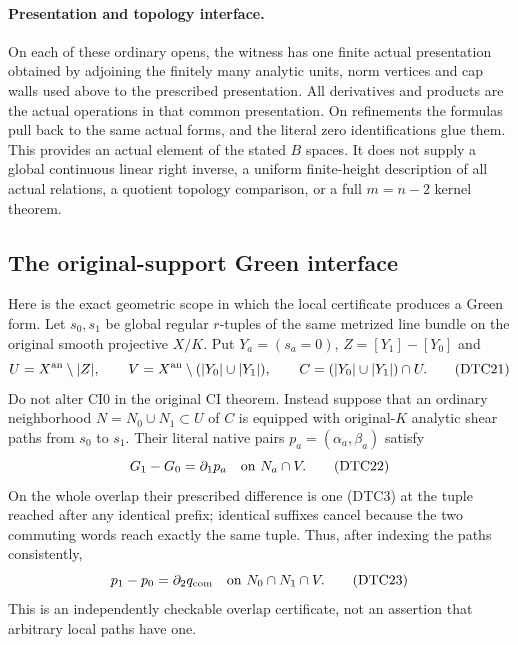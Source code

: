 \paragraph{Presentation and topology interface.}
On each of these ordinary opens, the witness has one finite actual
presentation obtained by adjoining the finitely many analytic units,
norm vertices and cap walls used above to the prescribed presentation.
All derivatives and products are the actual operations in that common
presentation.  On refinements the formulas pull back to the same
actual forms, and the literal zero identifications glue them.
This provides an actual element of the stated $B$ spaces.  It does
not supply a global continuous linear right inverse, a uniform
finite-height description of all actual relations, a quotient
topology comparison, or a full $m=n-2$ kernel theorem.

\subsection{The original-support Green interface}

Here is the exact geometric scope in which the local certificate
produces a Green form.  Let $s_0,s_1$ be global regular $r$-tuples
of the same metrized line bundle on the original smooth projective
$X/K$.  Put $Y_a=(s_a=0)$, $Z=[Y_1]-[Y_0]$ and
\[
 U=X^{\rm an}\setminus|Z|,\qquad
 V=X^{\rm an}\setminus(|Y_0|\cup|Y_1|),\qquad
 C=(|Y_0|\cup|Y_1|)\cap U.
 \tag{DTC21}
\]
Do not alter CI0 in the original CI theorem.  Instead suppose that
an ordinary neighborhood $N=N_0\cup N_1\subset U$ of $C$ is
equipped with original-$K$ analytic shear paths from $s_0$ to $s_1$.
Their literal native pairs $p_a=(\alpha_a,\beta_a)$ satisfy
\[
 G_1-G_0=\partial_1p_a\quad\hbox{on }N_a\cap V.
 \tag{DTC22}
\]
On the whole overlap their prescribed difference is one (DTC3)
at the tuple reached after any identical prefix; identical suffixes
cancel because the two commuting words reach exactly the same tuple.
Thus, after indexing the paths consistently,
\[
 p_1-p_0=\partial_2q_{\rm com}\quad\hbox{on }N_0\cap N_1\cap V.
 \tag{DTC23}
\]
This is an independently checkable overlap certificate, not an
assertion that arbitrary local paths have one.

